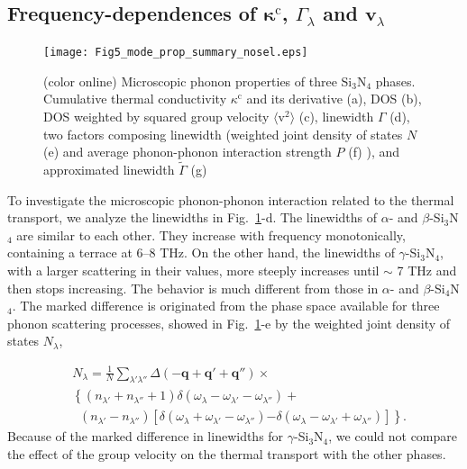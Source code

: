 \documentclass[twocolumn,amsmath,amssymb,a4paper,prb,superscriptaddress,floatfix]{revtex4-1}
\begin{document}
\subsection{Frequency-dependences of $\boldsymbol{\kappa}^\text{c}$, $\Gamma_\lambda$ and $\mathbf{v}$$_\lambda$}
\begin{figure}[ht]
 \begin{center}
  \texttt{[image: Fig5\_mode\_prop\_summary\_nosel.eps]}
  \caption{(color online) Microscopic phonon properties of three Si$_3$N$_4$
	  phases. Cumulative thermal conductivity $\kappa^\text{c}$ and its derivative
	  (a), DOS (b), DOS weighted by squared group velocity
	  $\langle\text{v}^2\rangle$ (c), linewidth $\Gamma$ (d), two factors
	  composing linewidth (weighted joint density of states $N$ (e) and average phonon-phonon
	  interaction strength $P$ (f) ), and approximated linewidth
	  $\tilde{\Gamma}$ (g) 
  \label{fig:Fig5_338_rev} }
 \end{center}
\end{figure}
To investigate the microscopic phonon-phonon interaction related to the thermal
transport, we analyze the linewidths in Fig.~\ref{fig:Fig5_338_rev}-d.
The linewidths of $\alpha$- and $\beta$-Si$_3$N$_4$ are similar to each other.
They increase with frequency monotonically, containing a terrace at 6--8 THz.
On the other hand, the linewidths of $\gamma$-Si$_3$N$_4$, with a larger
scattering in their values, more steeply increases until $\sim$ 7 THz and then
stops increasing.
The behavior is much different from those in $\alpha$- and $\beta$-Si$_4$N$_4$.
The marked difference is originated from the phase space available for three
phonon scattering processes, showed in Fig.~\ref{fig:Fig5_338_rev}-e by the
weighted joint density of states $N_\lambda$,

\begin{align}
 \label{eq:wjdos}
 &N_\lambda = \frac{1}{N}
  \sum_{\lambda' \lambda''}
  \Delta(-\mathbf{q}+\mathbf{q}'+\mathbf{q}'') \times \nonumber \\ 
 &\left\{ (n_{\lambda'} + n_{\lambda''}+1) 
   \delta(\omega_\lambda-\omega_{\lambda'}-\omega_{\lambda''}) \right.
   + \nonumber \\ 
 &\;\;(n_{\lambda'}-n_{\lambda''})
  \left[\delta(\omega_\lambda +\omega_{\lambda'}-\omega_{\lambda''})
 \right. 
 \left. -\left. \delta(\omega_\lambda - \omega_{\lambda'}+\omega_{\lambda''})
 \right]\right\}.
\end{align}
Because of the marked difference in linewidths for $\gamma$-Si$_3$N$_4$, we
could not compare the effect of the group velocity on the thermal transport with
the other phases.
\end{document}

